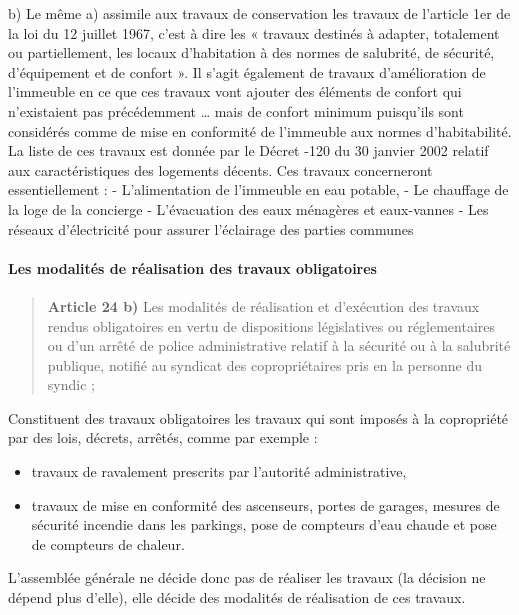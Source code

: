 				b) Le même a) assimile aux travaux de conservation les travaux de l’article 1er de la loi du 12 juillet 1967, c’est à dire les « travaux destinés à adapter, totalement ou partiellement, les locaux d'habitation à des normes de salubrité, de sécurité, d'équipement et de confort ».
				Il s’agit également de travaux d’amélioration de l’immeuble en ce que ces travaux vont ajouter des éléments de confort qui n’existaient pas précédemment … mais de confort minimum puisqu’ils sont considérés comme de mise en conformité de l’immeuble aux normes d’habitabilité.
				La liste de ces travaux est donnée par le Décret -120 du 30 janvier 2002 relatif aux caractéristiques des logements décents. Ces travaux concerneront essentiellement :
				- L’alimentation de l’immeuble en eau potable,
				- Le chauffage de la loge de la concierge
				- L’évacuation des eaux ménagères et eaux-vannes
				- Les réseaux d’électricité pour assurer l’éclairage des parties communes
			
			\paragraph{Les modalités de réalisation des travaux obligatoires}
			
				\begin{quote}
					\textbf{Article 24 b)} Les modalités de réalisation et d'exécution des travaux rendus obligatoires en vertu de dispositions législatives ou réglementaires ou d'un arrêté de police administrative relatif à la sécurité ou à la salubrité publique, notifié au syndicat des copropriétaires pris en la personne du syndic ;
				\end{quote}
				
				Constituent des travaux obligatoires les travaux qui sont imposés à la copropriété par des lois, décrets, arrêtés, comme par exemple :
				\begin{itemize}
					\item travaux de ravalement prescrits par l'autorité administrative,
					\item travaux de mise en conformité des ascenseurs, portes de garages, mesures de sécurité incendie dans les parkings, pose de compteurs d'eau chaude et pose de compteurs de chaleur.
				\end{itemize}
				
				L’assemblée générale ne décide donc pas de réaliser les travaux (la décision ne dépend plus d’elle), elle décide des modalités de réalisation de ces travaux.
				
